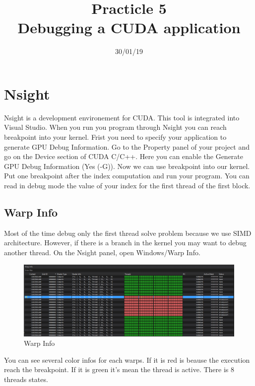 \documentclass{article}
\begin{document}
\title{Practicle 5\\Debugging a CUDA application}
\date{30/01/19}
\maketitle

\begin{abstract}
	
\end{abstract}

\section{Nsight}
Nsight is a development environement for CUDA. This tool is integrated into Visual Studio. When you run you program through Nsight you can reach breakpoint into your kernel. Frist you need to specify your application to generate GPU Debug Information. Go to the Property panel of your project and go on the Device section of CUDA C/C++. Here you can enable the Generate GPU Debug Information (Yes (-G)). Now we can use breakpoint into our kernel. Put one breakpoint after the index computation and run your program. You can read in debug mode the value of your index for the first thread of the first block.
\subsection{Warp Info}
Most of the time debug only the first thread solve problem because we use SIMD architecture. However, if there is a branch in the kernel you may want to debug another thread. On the Nsight panel, open Windows/Warp Info.

\begin{figure}[h]
	\centering
	\includegraphics[scale=0.47]{figures/warpinfo.png}
	\caption{Warp Info}
\end{figure}

You can see several color infos for each warps. If it is red is beause the execution reach the breakpoint. If it is green it's mean the thread is active. There is 8 threads states.
\end{document}
